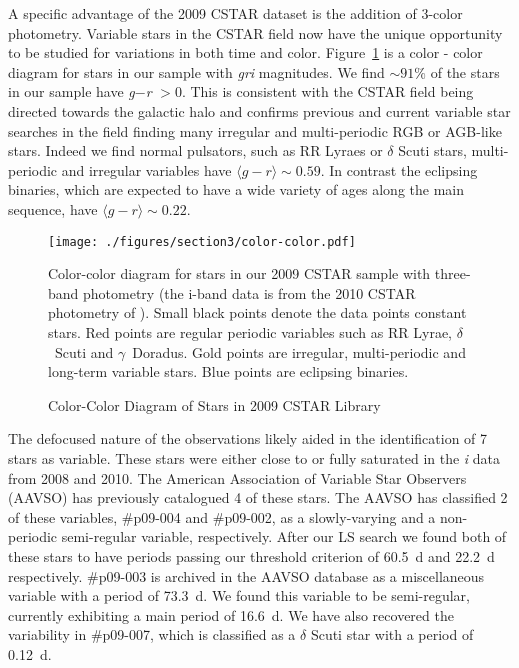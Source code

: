 A specific advantage of the 2009 CSTAR dataset is the addition of 3-color photometry. Variable stars in the CSTAR field now have the unique opportunity to be studied for variations in both time and color. Figure~\ref{fig:ccplot} is a color - color diagram for stars in our sample with \textit{gri} magnitudes. We find $\sim91\%$ of the stars in our sample have \textit{g}$-$\textit{r} $>0$. This is consistent with the CSTAR field being directed towards the galactic halo and confirms previous and current variable star searches in the field finding many irregular and multi-periodic RGB or AGB-like stars. Indeed we find normal pulsators, such as RR Lyraes or $\delta$ Scuti stars, multi-periodic and irregular variables have $\langle g\!-\!r \rangle \sim 0.59$. In contrast the eclipsing binaries, which are expected to have a wide variety of ages along the main sequence, have $\langle g\!-\!r \rangle \sim 0.22$. 

\begin{figure}[H]
\begin{center}
\singlespace
\texttt{[image: ./figures/section3/color-color.pdf]}
\end{center}
\singlespace
\caption{Color-Color Diagram of Stars in 2009 CSTAR Library}   Color-color diagram for stars in our 2009 CSTAR sample with three-band photometry (the i-band data is from the 2010 CSTAR photometry of \citet{Wang2013}). Small black points denote the data points constant stars. Red points are regular periodic variables such as RR Lyrae, $\delta$~Scuti and $\gamma$~Doradus. Gold points are irregular, multi-periodic and long-term variable stars. Blue points are eclipsing binaries.\label{fig:ccplot}
\end{figure}

The defocused nature of the observations likely aided in the identification of 7 stars as variable. These stars were either close to or fully saturated in the \textit{i} data from 2008 and 2010. The American Association of Variable Star Observers (AAVSO) has previously catalogued 4 of these stars. The AAVSO has classified 2 of these variables, \#p09-004 and \#p09-002, as a slowly-varying and a non-periodic semi-regular variable, respectively. After our LS search we found both of these stars to have periods passing our threshold criterion of 60.5~d and 22.2~d respectively. \#p09-003 is archived in the  AAVSO database as a miscellaneous variable with a period of 73.3~d. We found this variable to be semi-regular, currently exhibiting a main period of 16.6~d. We have also recovered the variability in \#p09-007, which is classified as a $\delta$ Scuti star with a period of 0.12~d. 

